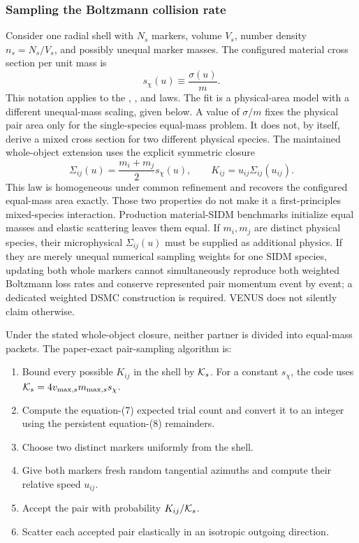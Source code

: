 \subsubsection{Sampling the Boltzmann collision rate}

Consider one radial shell with \(N_s\) markers, volume \(V_s\), number
density \(n_s=N_s/V_s\), and possibly unequal marker masses.  The configured
material cross section per unit mass is
\[
 s_\chi(u)\equiv\frac{\sigma(u)}{m}.
\]
This notation applies to the , , and
 laws. The  fit is a
physical-area model with a different unequal-mass scaling, given below.
A value of \(\sigma/m\) fixes the physical pair area only for the
single-species equal-mass problem.  It does not, by itself, derive a mixed
cross section for two different physical species.  The maintained
whole-object extension uses the explicit symmetric closure
\[
 \Sigma_{ij}(u)=\frac{m_i+m_j}{2}s_\chi(u),\qquad
 K_{ij}=u_{ij}\Sigma_{ij}(u_{ij}).                         \tag{S16a}
\]
This law is homogeneous under common refinement and recovers the configured
equal-mass area exactly.  Those two properties do not make it a
first-principles mixed-species interaction.  Production material-SIDM
benchmarks initialize equal masses and elastic scattering leaves them equal.
If \(m_i,m_j\) are distinct physical species, their microphysical
\(\Sigma_{ij}(u)\) must be supplied as additional physics.  If they are merely
unequal numerical sampling weights for one SIDM species, updating both whole
markers cannot simultaneously reproduce both weighted Boltzmann loss rates
and conserve represented pair momentum event by event; a dedicated weighted
DSMC construction is required.  VENUS does not silently claim otherwise.

Under the stated whole-object closure, neither partner is divided into
equal-mass packets.  The paper-exact pair-sampling algorithm is:
\begin{enumerate}
\item Bound every possible \(K_{ij}\) in the shell by \({\cal K}_s\).
      For a constant \(s_\chi\), the code uses
      \({\cal K}_s=4v_{\max,s}m_{\max,s}s_\chi\).
\item Compute the equation-(7) expected trial count and convert it to an
      integer using the persistent equation-(8) remainders.
\item Choose two distinct markers uniformly from the shell.
\item Give both markers fresh random tangential azimuths and compute their
      relative speed \(u_{ij}\).
\item Accept the pair with probability \(K_{ij}/{\cal K}_s\).
\item Scatter each accepted pair elastically in an isotropic outgoing
      direction.
\end{enumerate}

